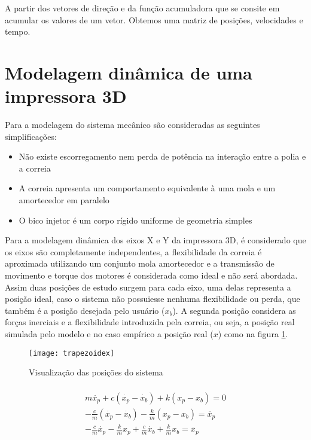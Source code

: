 A partir dos vetores de direção e da função acumuladora que se consite em acumular os valores de um vetor.
Obtemos uma matriz de posições, velocidades e tempo.


\section{Modelagem dinâmica de uma impressora 3D}
Para a modelagem do sistema mecânico são consideradas as seguintes simplificações:
\begin{itemize}
    \item Não existe escorregamento nem perda de potência na interação entre a polia e a correia
    \item A correia apresenta um comportamento equivalente à uma mola e um amortecedor em paralelo
    \item O bico injetor é um corpo rígido uniforme de geometria simples
\end{itemize}

Para a modelagem dinâmica dos eixos X e Y da impressora 3D, 
é considerado que os eixos são completamente independentes, 
a flexibilidade da correia é aproximada utilizando um conjunto 
mola amortecedor e a transmissão de movimento e torque dos 
motores é considerada como ideal e não será abordada.
Assim duas posições de estudo surgem para cada eixo, uma delas 
representa a posição ideal, caso o sistema não possuiesse nenhuma flexibilidade
ou perda, que também é a posição desejada pelo usuário ($x_b$). 
A segunda posição considera as forças inerciais e a 
flexibilidade introduzida pela correia, ou seja, a posição real simulada pelo modelo
e no caso empírico a posição real ($x$) como na figura \ref{fig:din_model}.

\begin{figure}[!htb]
    \centering
    \caption{Visualização das posições do sistema}
    \texttt{[image: trapezoidex]}

    \label{fig:din_model}
\end{figure}

\begin{multline}
    \label{eq:mov_impressora}
    \\
    m \ddot{x_p} + c(\dot{x_p} - \dot{x_b}) + k(x_p-x_b) = 0 \\
    - \frac{c}{m}(\dot{x_p} - \dot{x_b}) - \frac{k}{m}(x_p-x_b) = \ddot{x_p} \\
    - \frac{c}{m} \dot{x_p} - \frac{k}{m} x_p + \frac{c}{m} \dot{x_b} + \frac{k}{m} x_b  = \ddot{x_p} \\
\end{multline}

